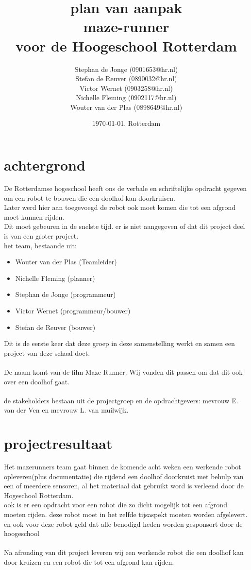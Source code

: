 \documentclass[oneside]{book}
\title{plan van aanpak\\
maze-runner\\
\normalsize voor de Hoogeschool Rotterdam
}
\author{
	Stephan de Jonge (0901653@hr.nl)\\
	Stefan de Reuver (0890032@hr.nl)\\
	Victor Wernet (0903258@hr.nl)\\
	Nichelle Fleming (0902117@hr.nl)\\
	Wouter van der Plas (0898649@hr.nl)
}
\date{\today, Rotterdam}
\begin{document}
\maketitle
\tableofcontents


\chapter{achtergrond}

De Rotterdamse hogeschool heeft ons de verbale en schriftelijke opdracht gegeven om een robot te bouwen die een doolhof kan doorkruisen.\\
Later werd hier aan toegevoegd de robot  ook moet komen die tot een afgrond moet kunnen rijden.\\
Dit moet gebeuren in de snelste tijd. er is niet aangegeven of dat dit project deel is van een groter project.\\
het team, bestaande uit:\\
\begin{itemize}
	\item Wouter van der Plas (Teamleider)
	\item Nichelle Fleming (planner)
	\item Stephan de Jonge (programmeur)
	\item Victor Wernet (programmeur/bouwer)
	\item Stefan de Reuver (bouwer)
\end{itemize}	
Dit is de eerste keer dat deze groep in deze samenstelling werkt en samen een project van deze schaal doet.\\
\\
De naam komt van de film Maze Runner. Wij vonden dit passen om dat dit ook over een doolhof gaat.\\
\\
de stakeholders bestaan uit de projectgroep en de opdrachtgevers: mevrouw E. van der Ven en mevrouw L. van muilwijk.

\clearpage
\chapter{projectresultaat}
Het mazerunners team gaat binnen de komende acht weken een werkende robot opleveren(plus documentatie) die rijdend een doolhof doorkruist met behulp van een of meerdere sensoren, al het materiaal dat gebruikt word is verleend door de Hogeschool Rotterdam.\\
ook is er een opdracht voor een robot die zo dicht mogelijk tot een afgrond moeten rijden. deze robot moet in het zelfde tijsaspekt moeten worden afgelevert. en ook voor deze robot geld dat alle benodigd heden worden gesponsort door de hoogeschool\\
\\
Na afronding van dit project leveren wij een werkende robot die een doolhof kan door kruizen en een robot die tot een afgrond kan rijden.
\clearpage
\end{document}
